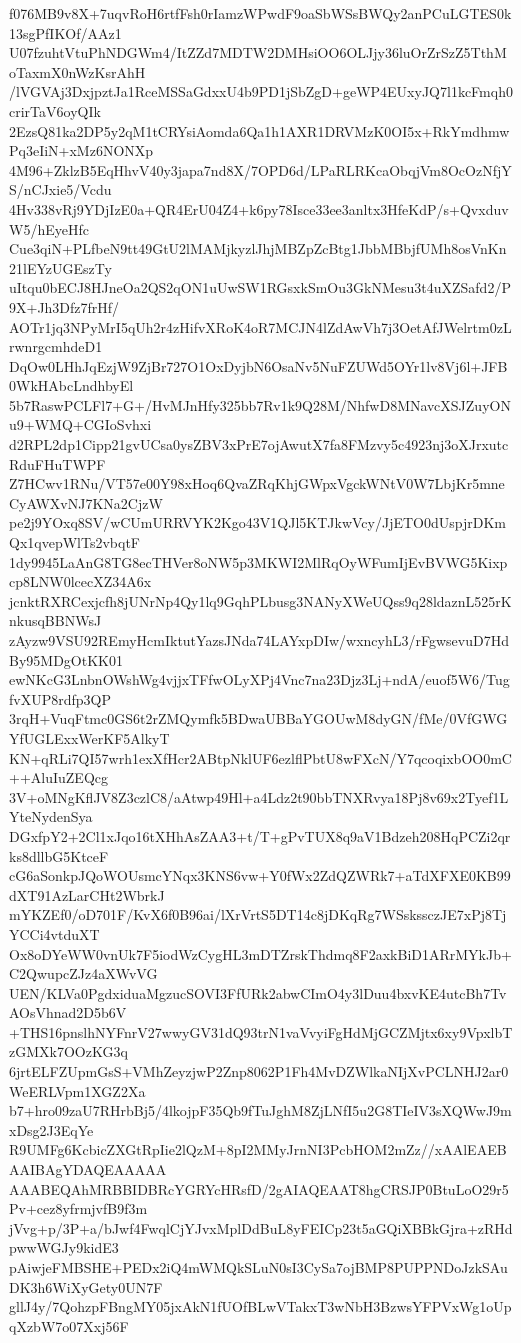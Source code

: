 f076MB9v8X+7uqvRoH6rtfFsh0rIamzWPwdF9oaSbWSsBWQy2anPCuLGTES0k13sgPfIKOf/AAz1
U07fzuhtVtuPhNDGWm4/ItZZd7MDTW2DMHsiOO6OLJjy36luOrZrSzZ5TthMoTaxmX0nWzKsrAhH
/lVGVAj3DxjpztJa1RceMSSaGdxxU4b9PD1jSbZgD+geWP4EUxyJQ7l1kcFmqh0crirTaV6oyQIk
2EzsQ81ka2DP5y2qM1tCRYsiAomda6Qa1h1AXR1DRVMzK0OI5x+RkYmdhmwPq3eIiN+xMz6NONXp
4M96+ZklzB5EqHhvV40y3japa7nd8X/7OPD6d/LPaRLRKcaObqjVm8OcOzNfjYS/nCJxie5/Vcdu
4Hv338vRj9YDjIzE0a+QR4ErU04Z4+k6py78Isce33ee3anltx3HfeKdP/s+QvxduvW5/hEyeHfc
Cue3qiN+PLfbeN9tt49GtU2lMAMjkyzlJhjMBZpZcBtg1JbbMBbjfUMh8osVnKn21lEYzUGEszTy
uItqu0bECJ8HJneOa2QS2qON1uUwSW1RGsxkSmOu3GkNMesu3t4uXZSafd2/P9X+Jh3Dfz7frHf/
AOTr1jq3NPyMrI5qUh2r4zHifvXRoK4oR7MCJN4lZdAwVh7j3OetAfJWelrtm0zLrwnrgcmhdeD1
DqOw0LHhJqEzjW9ZjBr727O1OxDyjbN6OsaNv5NuFZUWd5OYr1lv8Vj6l+JFB0WkHAbcLndhbyEl
5b7RaswPCLFl7+G+/HvMJnHfy325bb7Rv1k9Q28M/NhfwD8MNavcXSJZuyONu9+WMQ+CGIoSvhxi
d2RPL2dp1Cipp21gvUCsa0ysZBV3xPrE7ojAwutX7fa8FMzvy5c4923nj3oXJrxutcRduFHuTWPF
Z7HCwv1RNu/VT57e00Y98xHoq6QvaZRqKhjGWpxVgckWNtV0W7LbjKr5mneCyAWXvNJ7KNa2CjzW
pe2j9YOxq8SV/wCUmURRVYK2Kgo43V1QJl5KTJkwVcy/JjETO0dUspjrDKmQx1qvepWlTs2vbqtF
1dy9945LaAnG8TG8ecTHVer8oNW5p3MKWI2MlRqOyWFumIjEvBVWG5Kixpcp8LNW0lcecXZ34A6x
jcnktRXRCexjcfh8jUNrNp4Qy1lq9GqhPLbusg3NANyXWeUQss9q28ldaznL525rKnkusqBBNWsJ
zAyzw9VSU92REmyHcmIktutYazsJNda74LAYxpDIw/wxncyhL3/rFgwsevuD7HdBy95MDgOtKK01
ewNKcG3LnbnOWshWg4vjjxTFfwOLyXPj4Vnc7na23Djz3Lj+ndA/euof5W6/TugfvXUP8rdfp3QP
3rqH+VuqFtmc0GS6t2rZMQymfk5BDwaUBBaYGOUwM8dyGN/fMe/0VfGWGYfUGLExxWerKF5AlkyT
KN+qRLi7QI57wrh1exXfHcr2ABtpNklUF6ezlflPbtU8wFXcN/Y7qcoqixbOO0mC++AluIuZEQcg
3V+oMNgKflJV8Z3czlC8/aAtwp49Hl+a4Ldz2t90bbTNXRvya18Pj8v69x2Tyef1LYteNydenSya
DGxfpY2+2Cl1xJqo16tXHhAsZAA3+t/T+gPvTUX8q9aV1Bdzeh208HqPCZi2qrks8dllbG5KtceF
cG6aSonkpJQoWOUsmcYNqx3KNS6vw+Y0fWx2ZdQZWRk7+aTdXFXE0KB99dXT91AzLarCHt2WbrkJ
mYKZEf0/oD701F/KvX6f0B96ai/lXrVrtS5DT14c8jDKqRg7WSskssczJE7xPj8TjYCCi4vtduXT
Ox8oDYeWW0vnUk7F5iodWzCygHL3mDTZrskThdmq8F2axkBiD1ARrMYkJb+C2QwupcZJz4aXWvVG
UEN/KLVa0PgdxiduaMgzucSOVI3FfURk2abwCImO4y3lDuu4bxvKE4utcBh7TvAOsVhnad2D5b6V
+THS16pnslhNYFnrV27wwyGV31dQ93trN1vaVvyiFgHdMjGCZMjtx6xy9VpxlbTzGMXk7OOzKG3q
6jrtELFZUpmGsS+VMhZeyzjwP2Znp8062P1Fh4MvDZWlkaNIjXvPCLNHJ2ar0WeERLVpm1XGZ2Xa
b7+hro09zaU7RHrbBj5/4lkojpF35Qb9fTuJghM8ZjLNfI5u2G8TIeIV3sXQWwJ9mxDsg2J3EqYe
R9UMFg6KcbicZXGtRpIie2lQzM+8pI2MMyJrnNI3PcbHOM2mZz//xAAlEAEBAAIBAgYDAQEAAAAA
AAABEQAhMRBBIDBRcYGRYcHRsfD/2gAIAQEAAT8hgCRSJP0BtuLoO29r5Pv+cez8yfrmjvfB9f3m
jVvg+p/3P+a/bJwf4FwqlCjYJvxMplDdBuL8yFEICp23t5aGQiXBBkGjra+zRHdpwwWGJy9kidE3
pAiwjeFMBSHE+PEDx2iQ4mWMQkSLuN0sI3CySa7ojBMP8PUPPNDoJzkSAuDK3h6WiXyGety0UN7F
gllJ4y/7QohzpFBngMY05jxAkN1fUOfBLwVTakxT3wNbH3BzwsYFPVxWg1oUpqXzbW7o07Xxj56F
